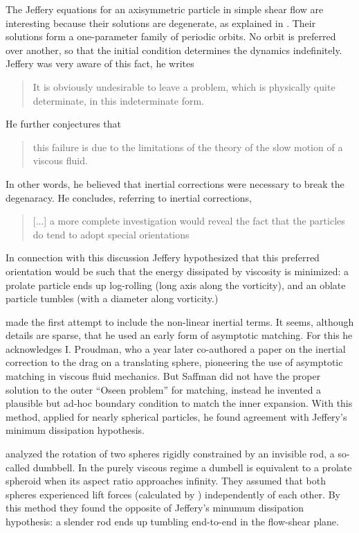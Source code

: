 \documentclass[thesis.tex]{subfiles}
\begin{document}
The Jeffery equations for an axisymmetric particle in simple shear flow are interesting because their solutions are degenerate, as explained in . Their solutions form a one-parameter family of periodic orbits. No orbit is preferred over another, so that the initial condition determines the dynamics indefinitely. Jeffery was very aware of this fact, he writes \blockquote{It is obviously undesirable to leave a problem, which is physically quite determinate, in this indeterminate form.}
He further conjectures that \blockquote{this failure is due to the limitations of the theory of the slow motion of a viscous fluid.}
In other words, he believed that inertial corrections were necessary to break the degenaracy. He concludes, referring to inertial corrections, \blockquote[][...]{[...] a more complete investigation would reveal the fact that the particles do tend to adopt special orientations} 
In connection with this discussion Jeffery hypothesized that this preferred orientation would be such that the energy dissipated by viscosity is minimized: a prolate particle ends up log-rolling (long axis along the vorticity), and an oblate particle tumbles (with a diameter along vorticity.)

\citet{saffman1956} made the first attempt to include the non-linear inertial terms. It seems, although details are sparse, that he used an early form of asymptotic matching. For this he acknowledges I. Proudman, who a year later co-authored a paper \cite{proudman1957} on the inertial correction to the drag on a translating sphere, pioneering the use of asymptotic matching in viscous fluid mechanics. But Saffman did not have the proper solution to the outer ``Oseen problem'' for matching, instead he invented a plausible but ad-hoc boundary condition to match the inner expansion. With this method, applied for nearly spherical particles, he found agreement with Jeffery's minimum dissipation hypothesis.

\citet{harper1968} analyzed the rotation of two spheres rigidly constrained by an invisible rod, a so-called dumbbell. In the purely viscous regime a dumbell is equivalent to a prolate spheroid when its aspect ratio approaches infinity. They assumed that both spheres experienced lift forces (calculated by \citet{saffman1965}) independently of each other. By this method they found the opposite of Jeffery's minumum dissipation hypothesis: a slender rod ends up tumbling end-to-end in the flow-shear plane.
\end{document}
